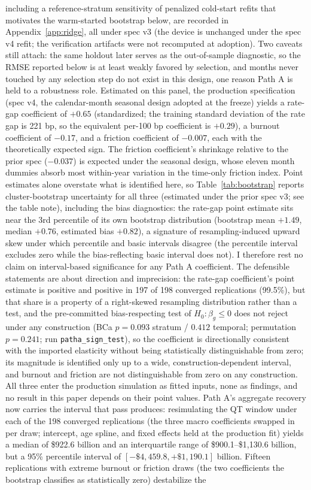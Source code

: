 \documentclass[12pt]{article}
\begin{document}
including a reference-stratum sensitivity of penalized cold-start refits that motivates the warm-started bootstrap below, are recorded in Appendix~\ref{app:ridge}, all under spec v3 (the device is unchanged under the spec v4 refit; the verification artifacts were not recomputed at adoption). Two caveats still attach: the same holdout later serves as the out-of-sample diagnostic, so the RMSE reported below is at least weakly favored by selection, and months never touched by any selection step do not exist in this design, one reason Path A is held to a robustness role.
Estimated on this panel, the production specification (spec v4, the calendar-month seasonal design adopted at the freeze) yields a rate-gap coefficient of $+0.65$ (standardized; the training standard deviation of the rate gap is 221 bp, so the equivalent per-100 bp coefficient is $+0.29$), a burnout coefficient of $-0.17$, and a friction coefficient of $-0.007$, each with the theoretically expected sign. The friction coefficient's shrinkage relative to the prior spec ($-0.037$) is expected under the seasonal design, whose eleven month dummies absorb most within-year variation in the time-only friction index. Point estimates alone overstate what is identified here, so Table~\ref{tab:bootstrap} reports cluster-bootstrap uncertainty for all three (estimated under the prior spec v3; see the table note), including the bias diagnostics: the rate-gap point estimate sits near the 3rd percentile of its own bootstrap distribution (bootstrap mean $+1.49$, median $+0.76$, estimated bias $+0.82$), a signature of resampling-induced upward skew under which percentile and basic intervals disagree (the percentile interval excludes zero while the bias-reflecting basic interval does not). I therefore rest no claim on interval-based significance for any Path A coefficient. The defensible statements are about direction and imprecision: the rate-gap coefficient's point estimate is positive and positive in 197 of 198 converged replications (99.5\%), but that share is a property of a right-skewed resampling distribution rather than a test, and the pre-committed bias-respecting test of $H_0\!: \beta_g \le 0$ does not reject under any construction (BCa $p = 0.093$ stratum / $0.412$ temporal; permutation $p = 0.241$; run \texttt{patha\_sign\_test}), so the coefficient is directionally consistent with the imported elasticity without being statistically distinguishable from zero; its magnitude is identified only up to a wide, construction-dependent interval, and burnout and friction are not distinguishable from zero on any construction. All three enter the production simulation as fitted inputs, none as findings, and no result in this paper depends on their point values. Path A's aggregate recovery now carries the interval that pass produces: resimulating the QT window under each of the 198 converged replications (the three macro coefficients swapped in per draw; intercept, age spline, and fixed effects held at the production fit) yields a median of \$922.6 billion and an interquartile range of \$900.1--\$1{,}130.6 billion, but a 95\% percentile interval of $[-\$4{,}459.8, +\$1{,}190.1]$ billion. Fifteen replications with extreme burnout or friction draws (the two coefficients the bootstrap classifies as statistically zero) destabilize the 
\end{document}

